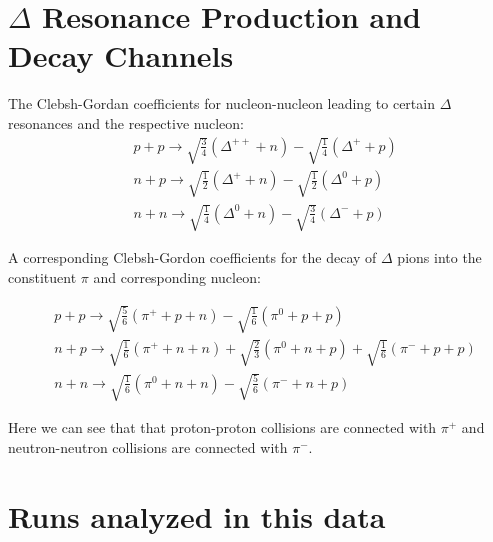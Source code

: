 \renewcommand{\thefigure}{A\arabic{figure}}
\renewcommand{\thetable}{A\arabic{figure}}

\section{$\Delta$ Resonance Production and Decay Channels}
\label{appen:deltadecay}

The Clebsh-Gordan coefficients for nucleon-nucleon leading to certain $\Delta$ resonances and the respective nucleon: 
\begin{equation}
\begin{split}
& p + p \rightarrow \sqrt{\frac{3}{4}}(\Delta^{++} + n) - \sqrt{\frac{1}{4}}(\Delta^{+} + p) \\
& n + p \rightarrow \sqrt{\frac{1}{2}}(\Delta^{+} + n) - \sqrt{\frac{1}{2}}(\Delta^{0} + p)  \\
& n + n \rightarrow \sqrt{\frac{1}{4}}(\Delta^{0} + n) - \sqrt{\frac{3}{4}}(\Delta^{-} + p) 
\end{split}
\label{eq:deltaProduction}
\end{equation}

A corresponding Clebsh-Gordon coefficients for the decay of $\Delta$ pions into the constituent $\pi$ and corresponding nucleon:

\begin{equation}
\begin{split}
& p + p \rightarrow \sqrt{\frac{5}{6}}(\pi^+ + p + n) - \sqrt{\frac{1}{6}}(\pi^0 + p + p) \\
& n + p \rightarrow \sqrt{\frac{1}{6}}(\pi^+ + n + n) + \sqrt{\frac{2}{3}}(\pi^0 + n + p) + \sqrt{\frac{1}{6}}(\pi^- + p + p)  \\
& n + n \rightarrow \sqrt{\frac{1}{6}}(\pi^0 + n + n) - \sqrt{\frac{5}{6}}(\pi^- + n + p) 
\end{split}
\label{eq:pionProduction}
\end{equation}

Here we can see that that proton-proton collisions are connected with $\pi^+$ and neutron-neutron collisions are connected with $\pi^-$. 


\section{Runs analyzed in this data}

\newcommand{\hsn}{$^{132}$Sn+$^{124}$Sn}
\newcommand{\mhsn}{$^{124}$Sn+$^{112}$Sn}
\newcommand{\mlsn}{$^{112}$Sn+$^{124}$Sn}
\newcommand{\lsn}{$^{108}$Sn+$^{112}$Sn}


